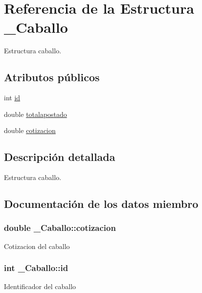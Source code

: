 \hypertarget{struct__Caballo}{}\section{Referencia de la Estructura \+\_\+\+Caballo}
\label{struct__Caballo}


Estructura caballo.  


\subsection*{Atributos públicos}
\begin{DoxyCompactItemize}
\item 
int \hyperlink{struct__Caballo_a233e3c2f3372a27dcff1e4161cbb9ff4}{id}
\item 
double \hyperlink{struct__Caballo_ac18791b370ba0dfbf8bb29554e701cb3}{totalapostado}
\item 
double \hyperlink{struct__Caballo_a69f38b3e2d3718a80b71b5384ab7ffb8}{cotizacion}
\end{DoxyCompactItemize}


\subsection{Descripción detallada}
Estructura caballo. 

\subsection{Documentación de los datos miembro}
\subsubsection[{\texorpdfstring{cotizacion}{cotizacion}}]{\setlength{\rightskip}{0pt plus 5cm}double \+\_\+\+Caballo\+::cotizacion}\hypertarget{struct__Caballo_a69f38b3e2d3718a80b71b5384ab7ffb8}{}\label{struct__Caballo_a69f38b3e2d3718a80b71b5384ab7ffb8}
Cotizacion del caballo 
\subsubsection[{\texorpdfstring{id}{id}}]{\setlength{\rightskip}{0pt plus 5cm}int \+\_\+\+Caballo\+::id}\hypertarget{struct__Caballo_a233e3c2f3372a27dcff1e4161cbb9ff4}{}\label{struct__Caballo_a233e3c2f3372a27dcff1e4161cbb9ff4}
Identificador del caballo 
